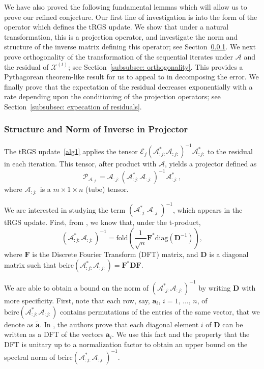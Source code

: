 \documentclass[10.5pt]{amsart}
\newcommand{\tens}[1]{\bm{\mathcal{#1}}}
\def\tA{{\tens{A}}}  %
\def\tX{{\tens{X}}}  %
\def\bcirc{{\text{bcirc}}}
\begin{document}
We have also proved the following fundamental lemmas which will allow us to prove our refined conjecture.  Our first line of investigation is into the form of the operator which defines the tRGS update.  We show that under a natural transformation, this is a projection operator, and investigate the norm and structure of the inverse matrix defining this operator; see Section~\ref{subsubsec:norm of inverse}.  We next prove orthogonality of the transformation of the sequential iterates under $\tA$ and the residual of $\tX^{(t)}$; see Section~\ref{subsubsec: orthogonality}.  This provides a Pythagorean theorem-like result for us to appeal to in decomposing the error.  We finally prove that the expectation of the residual decreases exponentially with a rate depending upon the conditioning of the projection operators; see Section~\ref{subsubsec: expecation of residuals}.

\subsubsection{Structure and Norm of Inverse in Projector}\label{subsubsec:norm of inverse} The tRGS update~\eqref{alg1} applies the tensor $\tens{E}_{j}(\tens{A}_{:j:}^{*}\tens{A}_{:j:})^{-1} \tens{A}_{:j:}^{*}$ to the residual in each iteration.  This tensor, after product with $\tA$, yields a projector defined as 
\[
    \mathcal{P}_{\tA_{:j:}} = \tA_{:j:}(\tA_{:j:}^\ast\tA_{:j:})^{-1}\tA_{:j:}^\ast,
\]
where $\tA_{:j:}$ is a $m \times 1 \times n$ (tube) tensor. 

\noindent We are interested in studying the term $(\tA_{:j:}^\ast\tA_{:j:})^{-1}$, which appears in the tRGS update. First, from \cite{ma2022randomized}, we know that, under the t-product,
\[
    (\tA_{:j:}^\ast\tA_{:j:})^{-1} = \text{fold}\left(\frac{1}{\sqrt{n}} \mathbf{F}^* \text{diag}(\mathbf{D}^{-1}) \right),
\]
where $\mathbf{F}$ is the Discrete Fourier Transform (DFT) matrix, and $\mathbf{D}$ is a diagonal matrix such that $\text{bcirc}(\tA_{:j:}^\ast\tA_{:j:}) = \mathbf{F}^* \mathbf{D}\mathbf{F}$.

We are able to obtain a bound on the norm of $(\tA_{:j:}^\ast\tA_{:j:})^{-1}$ by writing $\mathbf{D}$ with more specificity. First, note that each row, say, $\mathbf{a}_i$, $i = 1,\, \hdots,\, n$, of $\text{bcirc}(\tA_{:j:}^\ast\tA_{:j:})$ contains permutations of the entries of the same vector, that we denote as $\mathbf{\tilde{a}}$. In \cite{mazger1983}, the authors prove that each diagonal element $i$ of $\mathbf{D}$ can be written as a DFT of the vectors $\mathbf{a}_i$. We use this fact and the property that the DFT is unitary up to a normalization factor to obtain an upper bound on the spectral norm of $\bcirc{(\tA_{:j:}^\ast\tA_{:j:})^{-1}}$.
\end{document}
